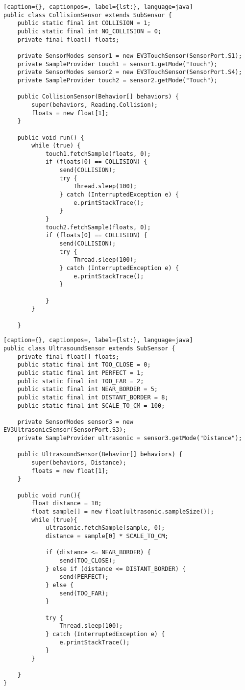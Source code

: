 \begin{lstlisting}[caption={}, captionpos=, label={lst:}, language=java]
public class CollisionSensor extends SubSensor {
    public static final int COLLISION = 1;
    public static final int NO_COLLISION = 0;
    private final float[] floats;

    private SensorModes sensor1 = new EV3TouchSensor(SensorPort.S1);
    private SampleProvider touch1 = sensor1.getMode("Touch");
    private SensorModes sensor2 = new EV3TouchSensor(SensorPort.S4);
    private SampleProvider touch2 = sensor2.getMode("Touch");

    public CollisionSensor(Behavior[] behaviors) {
        super(behaviors, Reading.Collision);
        floats = new float[1];
    }

    public void run() {
        while (true) {
            touch1.fetchSample(floats, 0);
            if (floats[0] == COLLISION) {
                send(COLLISION);
                try {
                    Thread.sleep(100);
                } catch (InterruptedException e) {
                    e.printStackTrace();
                }
            }
            touch2.fetchSample(floats, 0);
            if (floats[0] == COLLISION) {
                send(COLLISION);
                try {
                    Thread.sleep(100);
                } catch (InterruptedException e) {
                    e.printStackTrace();
                }

            }
        }

    }
\end{lstlisting}

\begin{lstlisting}[caption={}, captionpos=, label={lst:}, language=java]
public class UltrasoundSensor extends SubSensor {
    private final float[] floats;
    public static final int TOO_CLOSE = 0;
    public static final int PERFECT = 1;
    public static final int TOO_FAR = 2;
    public static final int NEAR_BORDER = 5;
    public static final int DISTANT_BORDER = 8;
    public static final int SCALE_TO_CM = 100;

    private SensorModes sensor3 = new EV3UltrasonicSensor(SensorPort.S3);
    private SampleProvider ultrasonic = sensor3.getMode("Distance");

    public UltrasoundSensor(Behavior[] behaviors) {
        super(behaviors, Distance);
        floats = new float[1];
    }

    public void run(){
        float distance = 10;
        float sample[] = new float[ultrasonic.sampleSize()];
        while (true){
            ultrasonic.fetchSample(sample, 0);
            distance = sample[0] * SCALE_TO_CM;

            if (distance <= NEAR_BORDER) {
                send(TOO_CLOSE);
            } else if (distance <= DISTANT_BORDER) {
                send(PERFECT);
            } else {
                send(TOO_FAR);
            }

            try {
                Thread.sleep(100);
            } catch (InterruptedException e) {
                e.printStackTrace();
            }
        }

    }
}
\end{lstlisting}



